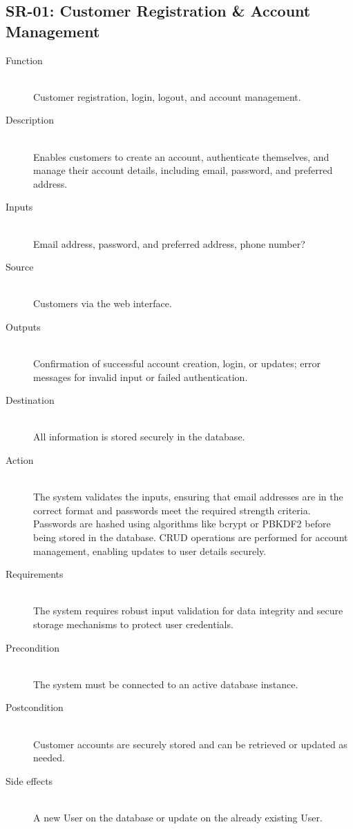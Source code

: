 \documentclass[twoside,a4paper,journal]{IEEEtran}
\begin{document}
\subsection{SR-01: Customer Registration \& Account Management}
\begin{description}
  \item[Function] \hfill \\
  Customer registration, login, logout, and account management.
  \item[Description] \hfill \\
  Enables customers to
  create an account, authenticate themselves, and manage their account details,
  including email, password, and preferred address.
  \item[Inputs] \hfill \\
  Email address,
  password, and preferred address, phone number?
  \item[Source] \hfill \\
  Customers via the
  web interface.
  \item[Outputs] \hfill \\
  Confirmation of
  successful account creation, login, or updates; error messages for invalid
  input or failed authentication.
  \item[Destination] \hfill \\
  All information is
  stored securely in the database.
  \item[Action] \hfill \\
  The system validates the inputs, ensuring that email
  addresses are in the correct format and passwords meet the required strength
  criteria. Passwords are hashed using algorithms like bcrypt or PBKDF2 before
  being stored in the database. CRUD operations are performed for account
  management, enabling updates to user details securely.
  \item[Requirements] \hfill \\
  The system requires robust input validation for data
  integrity and secure storage mechanisms to protect user credentials.
  \item[Precondition] \hfill \\
  The system must be connected to an active database
  instance.
  \item[Postcondition] \hfill \\
  Customer accounts are securely stored and can be
  retrieved or updated as needed.
  \item[Side effects] \hfill \\
  A new User on the database or update on the already
  existing User.
\end{description}
\end{document}
